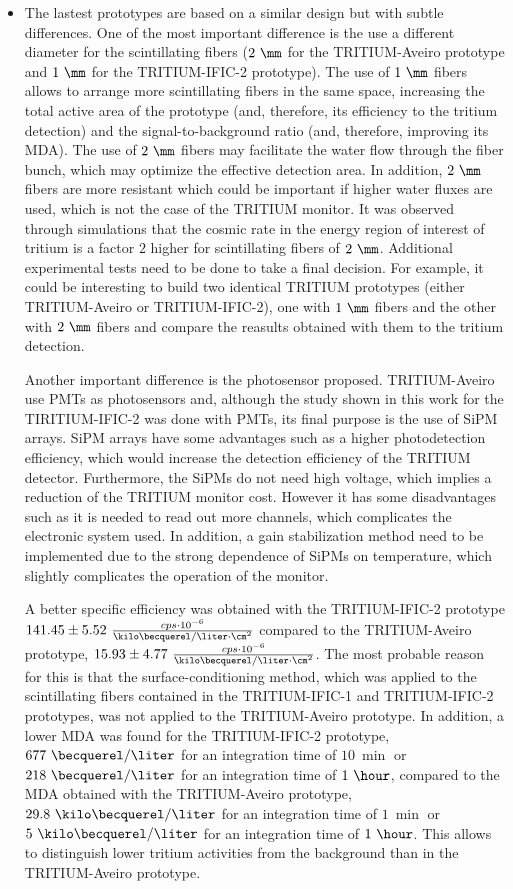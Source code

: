 \begin{enumerate}
\begin{itemize}
\item{} The lastest prototypes are based on a similar design but with subtle differences. One of the most important difference is the use a different diameter for the scintillating fibers ($2~\mm$ for the TRITIUM-Aveiro prototype and $1~\mm$ for the TRITIUM-IFIC-2 prototype). The use of $1~\mm$ fibers allows to arrange more scintillating fibers in the same space, increasing the total active area of the prototype (and, therefore, its efficiency to the tritium detection) and the signal-to-background ratio (and, therefore, improving its MDA). The use of $2~\mm$ fibers may facilitate the water flow through the fiber bunch, which may optimize the effective detection area. In addition, $2~\mm$ fibers are more resistant which could be important if higher water fluxes are used, which is not the case of the TRITIUM monitor. It was observed through simulations that the cosmic rate in the energy region of interest of tritium is a factor $2$ higher for scintillating fibers of $2~\mm$. Additional experimental tests need to be done to take a final decision. For example, it could be interesting to build two identical TRITIUM prototypes (either TRITIUM-Aveiro or TRITIUM-IFIC-2), one with $1~\mm$ fibers and the other with $2~\mm$ fibers and compare the reasults obtained with them to the tritium detection.

Another important difference is the photosensor proposed. TRITIUM-Aveiro use PMTs as photosensors and, although the study shown in this work for the TIRITIUM-IFIC-2 was done with PMTs, its final purpose is the use of SiPM arrays. SiPM arrays have some advantages such as a higher photodetection efficiency, which would increase the detection efficiency of the TRITIUM detector. Furthermore, the SiPMs do not need high voltage, which implies a reduction of the TRITIUM monitor cost. However it has some disadvantages such as it is needed to read out more channels, which complicates the electronic system used. In addition, a gain stabilization method need to be implemented due to the strong dependence of SiPMs on temperature, which slightly complicates the operation of the monitor.

A better specific efficiency was obtained with the TRITIUM-IFIC-2 prototype $141.45 \pm 5.52~\frac{cps \cdot{} 10^{-6}}{\kilo\becquerel/ \liter \cdot{} \cm^2}$ compared to the TRITIUM-Aveiro prototype, $15.93\pm4.77~\frac{cps \cdot{} 10^{-6}}{\kilo\becquerel/ \liter \cdot{} \cm^2}$. The most probable reason for this is that the surface-conditioning method, which was applied to the scintillating fibers contained in the TRITIUM-IFIC-1 and TRITIUM-IFIC-2 prototypes, was not applied to the TRITIUM-Aveiro prototype. In addition, a lower MDA was found for the TRITIUM-IFIC-2 prototype, $677~\becquerel/\liter$ for an integration time of $10~\min$ or $218~\becquerel/\liter$ for an integration time of $1~\hour$, compared to the MDA obtained with the TRITIUM-Aveiro prototype, $29.8~\kilo\becquerel/\liter$ for an integration time of $1~\min$ or $5~\kilo\becquerel/\liter$ for an integration time of $1~\hour$. This allows to distinguish lower tritium activities from the background than in the TRITIUM-Aveiro prototype.


\end{itemize}
\end{enumerate}
